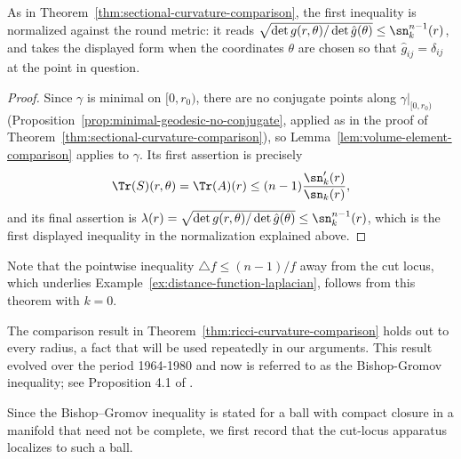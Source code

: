 As in Theorem~\ref{thm:sectional-curvature-comparison}, the first
inequality is normalized against the round metric: it reads
$\sqrt{\det g(r,\theta)/\det\hat g(\theta)}\le\sn_k^{n-1}(r)$, and
takes the displayed form when the coordinates $\theta$ are chosen
so that $\hat g_{ij}=\delta_{ij}$ at the point in question.

\begin{proof}
Since $\gamma$ is minimal on $[0,r_0)$, there are no conjugate
points along $\gamma|_{[0,r_0)}$
(Proposition~\ref{prop:minimal-geodesic-no-conjugate}, applied as in
the proof of Theorem~\ref{thm:sectional-curvature-comparison}), so
Lemma~\ref{lem:volume-element-comparison} applies to $\gamma$. Its
first assertion is precisely
$$\Tr(S)(r,\theta)=\Tr(A)(r)\le(n-1)\frac{\sn_k'(r)}{\sn_k(r)},$$
and its final assertion is
$\lambda(r)=\sqrt{\det g(r,\theta)/\det\hat g(\theta)}
\le\sn_k^{n-1}(r)$, which is the first displayed inequality in the
normalization explained above.
\end{proof}

Note that the pointwise inequality $\triangle f\le(n-1)/f$ away
from the cut locus, which underlies
Example~\ref{ex:distance-function-laplacian}, follows from this
theorem with $k=0$.

The comparison result in Theorem~\ref{thm:ricci-curvature-comparison} holds out to
every radius, a fact that will be used repeatedly in our arguments.
This result evolved over the period 1964-1980 and now is referred to
as the Bishop-Gromov inequality; see
Proposition 4.1 of \cite{CheegerGromovTaylor}.

Since the Bishop--Gromov inequality is stated for a ball with
compact closure in a manifold that need not be complete, we first
record that the cut-locus apparatus localizes to such a ball.

